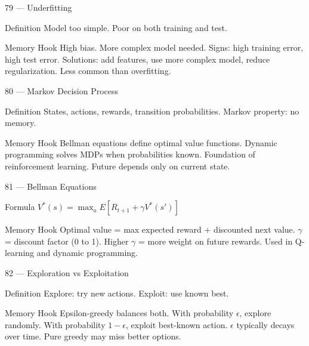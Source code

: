 \documentclass[aspectratio=169,8pt]{beamer}
\begin{document}
	\begin{frame}{79 --- Underfitting}
		\begin{block}{Definition}
			Model too simple. Poor on both training and test.
		\end{block}
		\begin{block}{Memory Hook}
			High bias. More complex model needed. Signs: high training error, high test error. Solutions: add features, use more complex model, reduce regularization. Less common than overfitting.
		\end{block}
	\end{frame}
	
	\begin{frame}{80 --- Markov Decision Process}
		\begin{block}{Definition}
			States, actions, rewards, transition probabilities. Markov property: no memory.
		\end{block}
		\begin{block}{Memory Hook}
			Bellman equations define optimal value functions. Dynamic programming solves MDPs when probabilities known. Foundation of reinforcement learning. Future depends only on current state.
		\end{block}
	\end{frame}
	
	\begin{frame}{81 --- Bellman Equations}
		\begin{block}{Formula}
			$V^*(s) = \max_a E[R_{t+1} + \gamma V^*(s')]$
		\end{block}
		\begin{block}{Memory Hook}
			Optimal value = max expected reward + discounted next value. $\gamma$ = discount factor (0 to 1). Higher $\gamma$ = more weight on future rewards. Used in Q-learning and dynamic programming.
		\end{block}
	\end{frame}
	
	\begin{frame}{82 --- Exploration vs Exploitation}
		\begin{block}{Definition}
			Explore: try new actions. Exploit: use known best.
		\end{block}
		\begin{block}{Memory Hook}
			Epsilon-greedy balances both. With probability $\epsilon$, explore randomly. With probability $1-\epsilon$, exploit best-known action. $\epsilon$ typically decays over time. Pure greedy may miss better options.
		\end{block}
	\end{frame}
	
\end{document}
